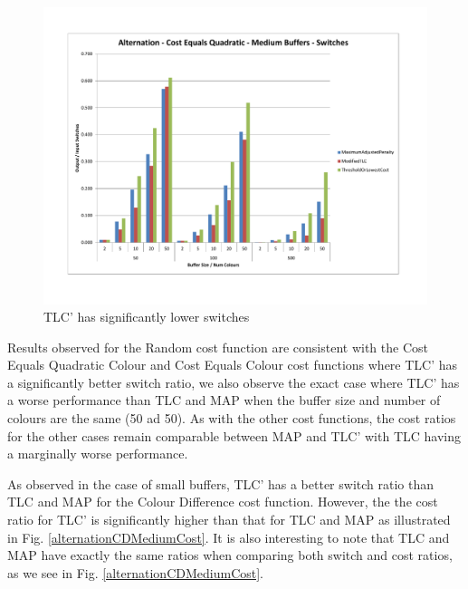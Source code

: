 \begin{figure}[ht]
\centering 
\includegraphics[scale=0.60]{Alternation-cq-medium-switches.pdf}
\caption{TLC' has significantly lower switches}
\label{alternationCQMediumSwitches}
\end{figure} 

Results observed for the Random cost function are consistent with the Cost Equals Quadratic Colour and Cost Equals Colour cost functions where TLC' has a significantly better switch ratio, we also observe the exact case where TLC' has a worse performance than TLC and MAP when the buffer size and number of colours are the same (50 ad 50). As with the other cost functions, the cost ratios for the other cases remain comparable between MAP and TLC' with TLC having a marginally worse performance. 

As observed in the case of small buffers, TLC' has a better switch ratio than TLC and MAP for the Colour Difference cost function. However, the the cost ratio for TLC' is significantly higher than that for TLC and MAP as illustrated in Fig. \ref{alternationCDMediumCost}. It is also interesting to note that TLC and MAP have exactly the same ratios when comparing both switch and cost ratios, as we see in Fig. \ref{alternationCDMediumCost}. 

